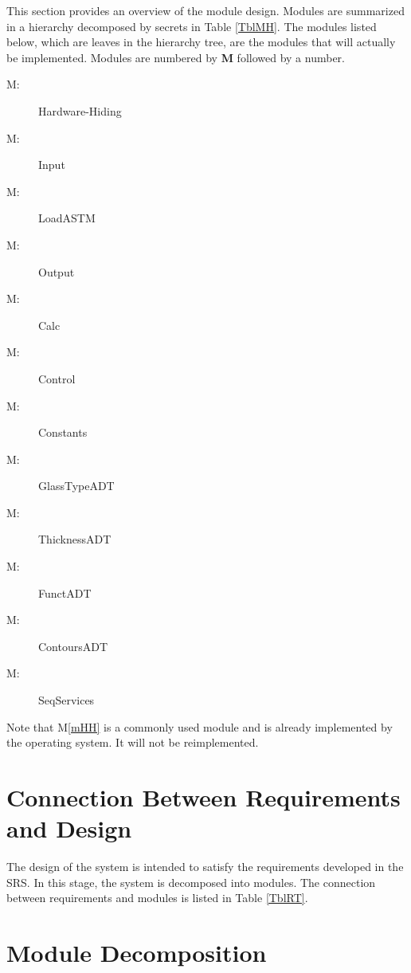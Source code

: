\documentclass[12pt]{article}
\newcounter{mnum}
\newcommand{\mthemnum}{M\themnum}
\newcommand{\mref}[1]{M\ref{#1}}
\begin{document}
This section provides an overview of the module design. Modules are summarized
in a hierarchy decomposed by secrets in Table \ref{TblMH}. The modules listed
below, which are leaves in the hierarchy tree, are the modules that will
actually be implemented.  Modules are numbered by \textbf{M}
followed by a number.

\begin{description}
\item [ \mthemnum \label{mHH}:] Hardware-Hiding
\item [ \mthemnum \label{mParams}:] Input
\item [ \mthemnum \label{mLoad}:] LoadASTM
\item [ \mthemnum \label{mOutput}:] Output
\item [ \mthemnum \label{mCalc}:]  Calc
\item [ \mthemnum \label{mControl}:] Control
\item [ \mthemnum \label{mConstants}:] Constants
\item [ \mthemnum \label{mGlassType}:] GlassTypeADT
\item [ \mthemnum \label{mThickness}:] ThicknessADT
\item [ \mthemnum \label{mFunctADT}:] FunctADT
\item [ \mthemnum \label{mContoursADT}:] ContoursADT
\item [ \mthemnum \label{mSeqServices}:] SeqServices
\end{description}

Note that \mref{mHH} is a commonly used module and is already implemented by 
the operating system.  It will not be reimplemented.

\section{Connection Between Requirements and Design} \label{SecConnection}

The design of the system is intended to satisfy the requirements developed in
the SRS. In this stage, the system is decomposed into modules. The connection
between requirements and modules is listed in Table \ref{TblRT}.

\section{Module Decomposition} \label{SecMD}
\end{document}
